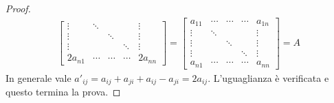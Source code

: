 \begin{proof}
\begin{displaymath}
\begin{split}
\begin{bmatrix}
\vdots & \ddots &		&		& \vdots\\
\vdots &  		& \ddots & 		& \vdots\\
\vdots & 		&		& \ddots & \vdots\\
2a_{n1}& \cdots & \cdots &\cdots & 2a_{nn}
\end{bmatrix} = 
\begin{bmatrix}
a_{11} & \cdots & \cdots &\cdots & a_{1n} \\
\vdots & \ddots &		&		& \vdots\\
\vdots &  		& \ddots & 		& \vdots\\
\vdots & 		&		& \ddots & \vdots\\
a_{n1} & \cdots & \cdots &\cdots & a_{nn}
\end{bmatrix} = A
\end{split}
\end{displaymath}
In generale vale $a'_{ij} = a_{ij} + a_{ji} + a_{ij} - a_{ji} = 2a_{ij}$.
L'uguaglianza \`e verificata e questo termina la prova.
\end{proof}
